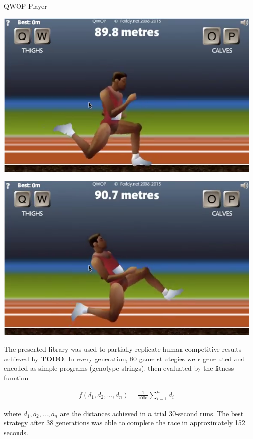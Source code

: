 \documentclass[a0paper,portrait]{baposter}
\newcommand*{\todo}{\textbf{TODO}}
\begin{document}
\begin{poster}
\begin{posterbox}[name=qwop,column=2]{QWOP Player}
\parbox[c]{0.49\linewidth}{\includegraphics[width=\linewidth]{runner1}}
\hfill
\parbox[c]{0.49\linewidth}{\includegraphics[width=\linewidth]{runner2}}

\vspace{0.5em}

The presented library was used to partially replicate human-competitive results achieved by \todo. In every generation, 80 game strategies were generated and encoded as simple programs (genotype strings), then evaluated by the fitness function

\vspace{-1.7em}

\begin{align*}
	f(d_1,d_2,\dots,d_n) = \frac{1}{100n} \sum_{i=1}^n d_i
\end{align*}

\vspace{-0.5em}

where $d_1,d_2,\dots,d_n$ are the distances achieved in $n$ trial 30-second runs. The best strategy after 38 generations was able to complete the race in approximately 152 seconds.


\end{posterbox}
\end{poster}
\end{document}
